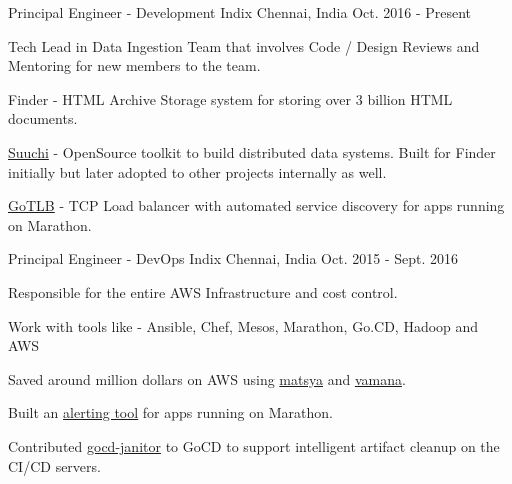 

\begin{cventries}

  \cventry
    {Principal Engineer - Development} %
    {Indix} %
    {Chennai, India} %
    {Oct. 2016 - Present} %
    {
      \begin{cvitems} %
        \item {Tech Lead in Data Ingestion Team that involves Code / Design Reviews and Mentoring for new members to the team. }
        \item {Finder - HTML Archive Storage system for storing over 3 billion HTML documents.}
        \item {\href{https://github.com/ashwanthkumar/suuchi}{Suuchi} - OpenSource toolkit to build distributed data systems. Built for Finder initially but later adopted to other projects internally as well. }
        \item {\href{https://github.com/ashwanthkumar/gotlb}{GoTLB} - TCP Load balancer with automated service discovery for apps running on Marathon. }
      \end{cvitems}
    }

  \cventry
    {Principal Engineer - DevOps} %
    {Indix} %
    {Chennai, India} %
    {Oct. 2015 - Sept. 2016} %
    {
      \begin{cvitems} %
        \item {Responsible for the entire AWS Infrastructure and cost control. }
        \item {Work with tools like - Ansible, Chef, Mesos, Marathon, Go.CD, Hadoop and AWS}
        \item {Saved around million dollars on AWS using \href{https://github.com/indix/matsya}{matsya} and \href{https://github.com/indix/vamana}{vamana}. }
        \item {Built an \href{https://github.com/ashwanthkumar/marathon-alerts}{alerting tool} for apps running on Marathon. }
        \item {Contributed \href{https://github.com/ashwanthkumar/gocd-janitor}{gocd-janitor} to GoCD to support intelligent artifact cleanup on the CI/CD servers. }
      \end{cvitems}
    }


\end{cventries}

